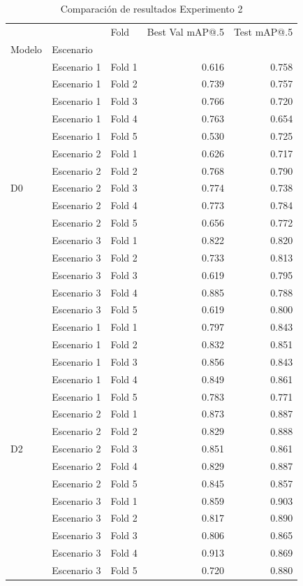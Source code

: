 \begin{table}
\caption{Comparación de resultados Experimento 2}
\label{tab:exp2}
\begin{tabular}{lllrr}
\toprule
 &  & Fold & Best Val mAP@.5 & Test mAP@.5 \\
Modelo & Escenario &  &  &  \\
\midrule
\multirow[c]{15}{*}{D0} & Escenario 1 & Fold 1 & 0.616 & 0.758 \\
 & Escenario 1 & Fold 2 & 0.739 & 0.757 \\
 & Escenario 1 & Fold 3 & 0.766 & 0.720 \\
 & Escenario 1 & Fold 4 & 0.763 & 0.654 \\
 & Escenario 1 & Fold 5 & 0.530 & 0.725 \\
 & Escenario 2 & Fold 1 & 0.626 & 0.717 \\
 & Escenario 2 & Fold 2 & 0.768 & 0.790 \\
 & Escenario 2 & Fold 3 & 0.774 & 0.738 \\
 & Escenario 2 & Fold 4 & 0.773 & 0.784 \\
 & Escenario 2 & Fold 5 & 0.656 & 0.772 \\
 & Escenario 3 & Fold 1 & 0.822 & 0.820 \\
 & Escenario 3 & Fold 2 & 0.733 & 0.813 \\
 & Escenario 3 & Fold 3 & 0.619 & 0.795 \\
 & Escenario 3 & Fold 4 & 0.885 & 0.788 \\
 & Escenario 3 & Fold 5 & 0.619 & 0.800 \\
\multirow[c]{15}{*}{D2} & Escenario 1 & Fold 1 & 0.797 & 0.843 \\
 & Escenario 1 & Fold 2 & 0.832 & 0.851 \\
 & Escenario 1 & Fold 3 & 0.856 & 0.843 \\
 & Escenario 1 & Fold 4 & 0.849 & 0.861 \\
 & Escenario 1 & Fold 5 & 0.783 & 0.771 \\
 & Escenario 2 & Fold 1 & 0.873 & 0.887 \\
 & Escenario 2 & Fold 2 & 0.829 & 0.888 \\
 & Escenario 2 & Fold 3 & 0.851 & 0.861 \\
 & Escenario 2 & Fold 4 & 0.829 & 0.887 \\
 & Escenario 2 & Fold 5 & 0.845 & 0.857 \\
 & Escenario 3 & Fold 1 & 0.859 & 0.903 \\
 & Escenario 3 & Fold 2 & 0.817 & 0.890 \\
 & Escenario 3 & Fold 3 & 0.806 & 0.865 \\
 & Escenario 3 & Fold 4 & 0.913 & 0.869 \\
 & Escenario 3 & Fold 5 & 0.720 & 0.880 \\
\bottomrule
\end{tabular}
\end{table}
